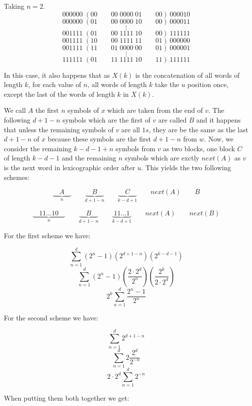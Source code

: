 \documentclass[11pt,a4paper]{tesis}
\theoremstyle{definition}
\begin{document}
Taking $n = 2$.
$$000000\; (00 \qquad 00 \; 0000 \; 01 \qquad 00) \: 000010$$
$$000000\; (01 \qquad 00 \; 0000 \; 10 \qquad 00) \: 000011$$
$$\vdots$$
$$001111\; (01 \qquad 00 \; 1111 \; 10 \qquad 00) \: 111111$$
$$001111\; (10 \qquad 00 \; 1111 \; 11 \qquad 01) \: 000000$$
$$001111\; (11 \qquad 01 \; 0000 \; 00 \qquad 01) \: 000001$$
$$\vdots$$
$$111111\; (01 \qquad 11 \; 1111 \; 10 \qquad 11) \: 111111$$

In this case, it also happens that as $X(k)$ is the concatenation of all words of length $k$, for each value of $n$, 
all words of length $k$ take the $u$ position once, except the last of the words of length $k$ in $X(k)$.

We call $A$ the first $n$ symbols of $x$ which are taken from the end of $v$. The following $d + 1 - n$ symbols which are the first of $v$ are called $B$ and it happens that unless the remaining symbols of $v$ are all $1s$, 
they are be the same as the last $d + 1 - n$ of $x$ because these symbols are the first $d + 1 - n$ from $w$.
Now, we consider the remaining $k - d - 1 + n$ symbols from $v$ as two blocks, one block $C$ of length $k - d - 1$ and the remaining $n$ symbols which are exctly $next(A)$ as $v$ is the next word in lexicographic order after $u$.
This yields the two following schemes:

$$\underbrace{\quad A \quad }_{n} \qquad \underbrace{\quad B \quad }_{d + 1 - n}  \qquad \underbrace{\quad C \quad }_{k-d+1} \qquad next(A) \qquad B$$

$$\underbrace{\quad 11\dots10 \quad }_{n} \qquad \underbrace{\quad B \quad }_{d + 1 - n}  \qquad \underbrace{\; 11\dots1 \; }_{k-d+1} \qquad next(A) \qquad next(B)$$

For the first scheme we have:

$$\sum_{n=1}^{d}(2^n - 1) (2^{d + 1 - n}) (2^{k - d - 1})$$
$$\sum_{n=1}^{d}(2^n - 1) (\frac{2 \cdot 2^d}{2^n})     (\frac{2^k}{2 \cdot 2^d})$$
$$ 2^k \sum_{n=1}^{d} \frac{2^n - 1}{2^n} $$


For the second scheme we have:

$$ \sum_{n=1}^{d} 2^{d + 1 - n}$$
$$ \sum_{n=1}^{d} 2 \frac{2^d}{2^{- n}}$$
$$ 2 \cdot 2^d \sum_{n=1}^{d} 2^{- n}$$

When putting them both together we get:
\end{document}
